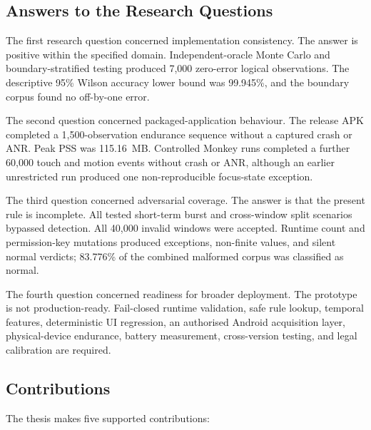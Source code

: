 \subsection{Answers to the Research Questions}

The first research question concerned implementation consistency. The answer is positive within the specified domain. Independent-oracle Monte Carlo and boundary-stratified testing produced 7,000 zero-error logical observations. The descriptive 95\% Wilson accuracy lower bound was 99.945\%, and the boundary corpus found no off-by-one error.

The second question concerned packaged-application behaviour. The release APK completed a 1,500-observation endurance sequence without a captured crash or ANR. Peak PSS was 115.16~MB. Controlled Monkey runs completed a further 60,000 touch and motion events without crash or ANR, although an earlier unrestricted run produced one non-reproducible focus-state exception.

The third question concerned adversarial coverage. The answer is that the present rule is incomplete. All tested short-term burst and cross-window split scenarios bypassed detection. All 40,000 invalid windows were accepted. Runtime count and permission-key mutations produced exceptions, non-finite values, and silent normal verdicts; 83.776\% of the combined malformed corpus was classified as normal.

The fourth question concerned readiness for broader deployment. The prototype is not production-ready. Fail-closed runtime validation, safe rule lookup, temporal features, deterministic UI regression, an authorised Android acquisition layer, physical-device endurance, battery measurement, cross-version testing, and legal calibration are required.

\subsection{Contributions}

The thesis makes five supported contributions:


